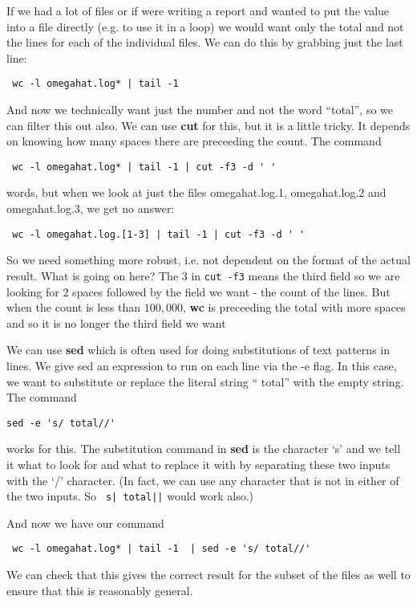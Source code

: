 \documentclass[10pt]{article}
\def\executable#1{\textbf{#1}}
\begin{document}
\begin{enumerate}
If we had a lot of files or if were writing a report and wanted 
to put the value into a file directly (e.g. to use it in a loop)
we would want only the total and not the lines for each of the
individual  files.
We can do this by grabbing just the last line:
\begin{verbatim}
 wc -l omegahat.log* | tail -1
\end{verbatim}
And now we technically want just the number and not the word
``total'', so we can filter this out also.
We can use \executable{cut} for this, but it 
is a little tricky. It depends on knowing how many spaces
there are preceeding the count.
The command
\begin{verbatim}
 wc -l omegahat.log* | tail -1 | cut -f3 -d ' '
\end{verbatim}
words, but  when we look at just the files
omegahat.log.1, omegahat.log.2 and omegahat.log.3,
we get no answer:
\begin{verbatim}
 wc -l omegahat.log.[1-3] | tail -1 | cut -f3 -d ' '
\end{verbatim}
So we need something more robust, i.e. not dependent
on the format of the actual result.
What is going on here?  The 3 in \verb+cut -f3+
means the third field so we are looking for 2 spaces
followed by the field we want - the count of the lines.
But when the count is less than $100,000$, 
\executable{wc} is preceeding the total with more
spaces and so it is no longer the third field we want

We can use \executable{sed} which is often
used for doing substitutions of text patterns 
in lines.
We give sed an expression to run on each line
via the -e flag.
In this case, we want to substitute or replace the
literal string  `` total'' with the empty string.
The command
\begin{verbatim}
sed -e 's/ total//'
\end{verbatim}
works for this.  The substitution command in \executable{sed}
is the character `s' and we tell it what to look for and
what to replace it with by separating these two inputs
with the `/' character. (In fact, we can use any character
that is not in either of the two inputs.  So 
\verb+ s| total||+ would work also.)

And now we have our command
\begin{verbatim}
 wc -l omegahat.log* | tail -1  | sed -e 's/ total//'
\end{verbatim}
We can check that this gives the correct result for
the subset of the files as well to ensure that this
is reasonably general.


\end{enumerate}
\end{document}
